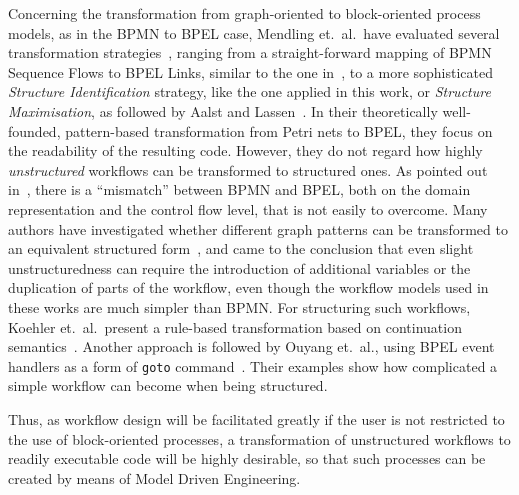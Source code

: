 Concerning the transformation from graph-oriented to block-oriented process models, as in the BPMN to BPEL case, Mendling et.~al.\ have evaluated several transformation strategies~\cite{mendling2005transformation}, ranging from a straight-forward mapping of BPMN Sequence Flows to BPEL Links, similar to the one in~\cite{white2005using}, to a more sophisticated \emph{Structure Identification} strategy, like the one applied in this work, or \emph{Structure Maximisation}, as followed by Aalst and Lassen~\cite{aalst2008translating}.  In their theoretically well-founded, pattern-based transformation from Petri nets to BPEL, they focus on the readability of the resulting code.  However, they do not regard how highly \emph{unstructured} workflows can be transformed to structured ones.  As pointed out in~\cite{recker2006translation}, there is a ``mismatch'' between BPMN and BPEL, both on the domain representation and the control flow level, that is not easily to overcome.  Many authors have investigated whether different graph patterns can be transformed to an equivalent structured form~\cite{Kiepuszewski2000structured, liu2005Analysis, sadiq2000analyzing}, and came to the conclusion that even slight unstructuredness can require the introduction of additional variables or the duplication of parts of the workflow, even though the workflow models used in these works are much simpler than BPMN.  For structuring such workflows, Koehler et.~al.\ present a rule-based transformation based on continuation semantics~\cite{koehler2004untangling}.  Another approach is followed by Ouyang et.~al., using BPEL event handlers as a form of \texttt{goto} command~\cite{ouyang2006translating_standard}.  Their examples show how complicated a simple workflow can become when being structured.

Thus, as workflow design will be facilitated greatly if the user is not restricted to the use of block-oriented processes, a transformation of unstructured workflows to readily executable code will be highly desirable, so that such processes can be created by means of Model Driven Engineering.
